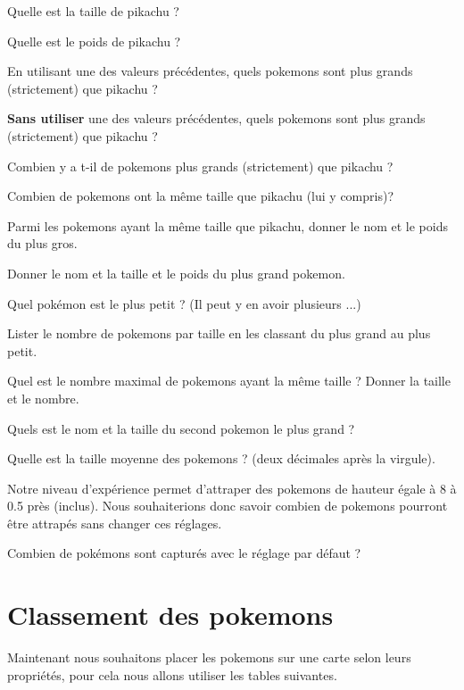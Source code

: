 \question{}
Quelle est la taille de pikachu ?

\question{}
Quelle est le poids de pikachu ?

\question{}
En utilisant une des valeurs précédentes, quels pokemons sont plus grands (strictement) que pikachu ?

\question{}
\textbf{Sans utiliser} une des valeurs précédentes, quels pokemons sont plus grands (strictement) que pikachu ?

\question{}
Combien y a t-il de pokemons plus grands (strictement) que pikachu ?

\question{}
Combien de pokemons ont la même taille que pikachu (lui y compris)? 

\question{}
Parmi les pokemons ayant la même taille que pikachu, donner le nom et le poids du plus gros. 


\question{}
Donner le nom et la taille et le poids du plus grand pokemon. 


\question{}
Quel pokémon est le plus petit ? (Il peut y en avoir plusieurs ...)


\question{}
Lister le nombre de pokemons par taille en les classant du plus grand au plus petit. 

\question{}
Quel est le nombre maximal de pokemons ayant la même taille ? 
Donner la taille et le nombre.

\question{}
Quels est le nom et la taille du second pokemon le plus grand ? 

\question{}
Quelle est la taille moyenne des pokemons ? (deux décimales après la virgule).


Notre niveau d'expérience permet d'attraper des pokemons de hauteur égale à 8 à 0.5 près (inclus).
Nous souhaiterions donc savoir combien de pokemons pourront être attrapés sans changer ces réglages.

\question{}
 Combien de pokémons sont capturés avec le réglage par défaut ?

\section*{Classement des pokemons}
Maintenant nous souhaitons placer les pokemons sur une carte selon leurs propriétés, pour cela nous allons utiliser les tables suivantes.


